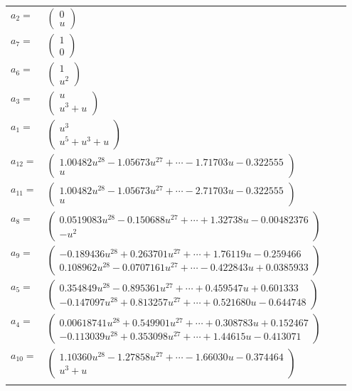 \documentclass[1p]{elsarticle_modified}
\theoremstyle{definition}
\begin{document}
\begin{tabular}{m{7pt} m{180pt} m{7pt} m{180pt} }
\flushright $a_{2}=$&$\begin{pmatrix}0\\u\end{pmatrix}$ \\
\flushright $a_{7}=$&$\begin{pmatrix}1\\0\end{pmatrix}$ \\
\flushright $a_{6}=$&$\begin{pmatrix}1\\u^2\end{pmatrix}$ \\
\flushright $a_{3}=$&$\begin{pmatrix}u\\u^3+u\end{pmatrix}$ \\
\flushright $a_{1}=$&$\begin{pmatrix}u^3\\u^5+u^3+u\end{pmatrix}$ \\
\flushright $a_{12}=$&$\begin{pmatrix}1.00482 u^{28}-1.05673 u^{27}+\cdots-1.71703 u-0.322555\\u\end{pmatrix}$ \\
\flushright $a_{11}=$&$\begin{pmatrix}1.00482 u^{28}-1.05673 u^{27}+\cdots-2.71703 u-0.322555\\u\end{pmatrix}$ \\
\flushright $a_{8}=$&$\begin{pmatrix}0.0519083 u^{28}-0.150688 u^{27}+\cdots+1.32738 u-0.00482376\\- u^2\end{pmatrix}$ \\
\flushright $a_{9}=$&$\begin{pmatrix}-0.189436 u^{28}+0.263701 u^{27}+\cdots+1.76119 u-0.259466\\0.108962 u^{28}-0.0707161 u^{27}+\cdots-0.422843 u+0.0385933\end{pmatrix}$ \\
\flushright $a_{5}=$&$\begin{pmatrix}0.354849 u^{28}-0.895361 u^{27}+\cdots+0.459547 u+0.601333\\-0.147097 u^{28}+0.813257 u^{27}+\cdots+0.521680 u-0.644748\end{pmatrix}$ \\
\flushright $a_{4}=$&$\begin{pmatrix}0.00618741 u^{28}+0.549901 u^{27}+\cdots+0.308783 u+0.152467\\-0.113039 u^{28}+0.353098 u^{27}+\cdots+1.44615 u-0.413071\end{pmatrix}$ \\
\flushright $a_{10}=$&$\begin{pmatrix}1.10360 u^{28}-1.27858 u^{27}+\cdots-1.66030 u-0.374464\\u^3+u\end{pmatrix}$\\&\end{tabular}
\end{document}
